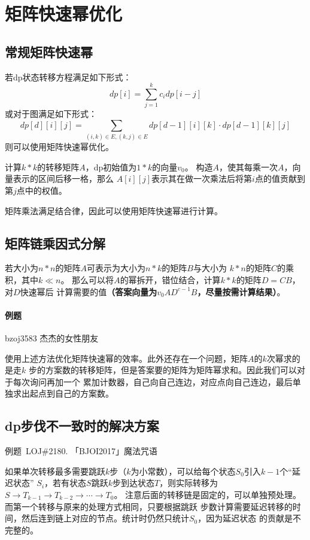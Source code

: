 \section{矩阵快速幂优化}
\subsection{常规矩阵快速幂}
若dp状态转移方程满足如下形式：
\begin{displaymath}
    dp[i]=\sum_{j=1}^k{c_idp[i-j]}
\end{displaymath}
或对于图满足如下形式：
\begin{displaymath}
    dp[d][i][j]=\sum_{(i,k)\in E,(k,j)\in E}{dp[d-1][i][k]\cdot dp[d-1][k][j]}
\end{displaymath}
则可以使用矩阵快速幂优化。

计算$k*k$的转移矩阵$A$，dp初始值为$1*k$的向量$v_0$。
构造$A$，使其每乘一次$A$，向量表示的区间后移一格，那么
$A[i][j]$表示其在做一次乘法后将第$i$点的值贡献到第$j$点中的权值。

矩阵乘法满足结合律，因此可以使用矩阵快速幂进行计算。

\subsection{矩阵链乘因式分解}

若大小为$n*n$的矩阵$A$可表示为大小为$n*k$的矩阵$B$与大小为
$k*n$的矩阵$C$的乘积，其中$k\ll n$。
那么可以将$A$的幂拆开，错位结合，计算$k*k$的矩阵$D=CB$，对$D$快速幂后
计算需要的值{\bfseries （答案向量为$v_0AD^{c-1}B$，尽量按需计算结果）}。

\paragraph{例题} bzoj3583 杰杰的女性朋友

使用上述方法优化矩阵快速幂的效率。此外还存在一个问题，矩阵$A$的$k$次幂求的是走$k$
步的方案数的转移矩阵，但是答案要的矩阵为矩阵幂求和。因此我们可以对于每次询问再加一个
累加计数器，自己向自己连边，对应点向自己连边，最后单独求出起点到自己的方案数。

\subsection{dp步伐不一致时的解决方案}
例题~LOJ\#2180. 「BJOI2017」魔法咒语

如果单次转移最多需要跳跃$k$步（$k$为小常数），可以给每个状态$S_0$引入$k-1$个``延迟状态''
$S_i$，若有状态$S$跳跃$k$步到达状态$T$，则实际转移为
$S\rightarrow T_{k-1} \rightarrow T_{k-2} \rightarrow \cdots \rightarrow T_0$。
注意后面的转移链是固定的，可以单独预处理。而第一个转移与原来的处理方式相同，只要根据跳跃
步数计算需要延迟转移的时间，然后连到链上对应的节点。统计时仍然只统计$S_0$，因为延迟状态
的贡献是不完整的。
